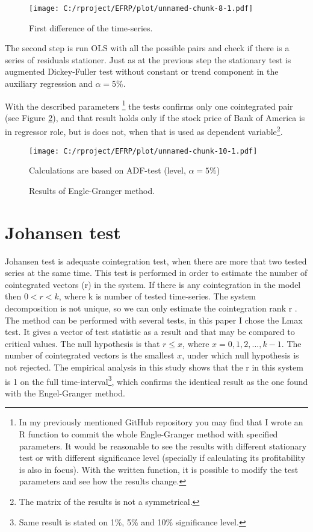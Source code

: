 \documentclass[12pt, a4paper, twoside, titlepage]{article}
\begin{document}
\begin{figure}[ht]
  \centering
  \texttt{[image: C:/rproject/EFRP/plot/unnamed-chunk-8-1.pdf]}
  \caption{First difference of the time-series.}
  \label{fig3}
\end{figure}

The second step is run OLS with all the possible pairs and check if there is a series of residuals stationer. Just as at the previous step the stationary test is augmented Dickey-Fuller test without constant or trend component in the auxiliary regression and $\alpha = 5\%$.

With the described parameters \footnote{In my previously mentioned GitHub repository you may find that I wrote an R function to commit the whole Engle-Granger method with specified parameters. It would be reasonable to see the results with different stationary test or with different significance level (specially if calculating its profitability is also in focus). With the written function, it is possible to modify the test parameters and see how the results change.} the tests confirms only one cointegrated pair (see Figure \ref{fig4}), and that result holds only if the stock price of Bank of America is in regressor role, but is does not, when that is used as dependent variable\footnote{The matrix of the results is not a symmetrical.}.

\begin{figure}[ht]
  \centering
  \texttt{[image: C:/rproject/EFRP/plot/unnamed-chunk-10-1.pdf]}
  \caption{Results of Engle-Granger method.}
  \label{fig4}
  Calculations are based on ADF-test (level, $\alpha = 5\%$)
\end{figure}

\section{Johansen test}

Johansen test is adequate cointegration test, when there are more that two tested series at the same time. This test is performed in order to estimate the number of cointegrated vectors (r) in the system. If there is any cointegration in the model then $0<r<k$, where k is number of tested time-series. The system decomposition is not unique, so we can only estimate the cointegration rank r \cite{Kirchgassner.2007}.
The method can be performed with several tests, in this paper I chose the Lmax test. It gives a vector of test statistic as a result and that may be compared to critical values. The null hypothesis is that $r \leq x$, where $x = 0, 1, 2, ..., k-1$. The number of cointegrated vectors is the smallest $x$, under which null hypothesis is not rejected. The empirical analysis in this study shows that the r in this system is 1 on the full time-interval\footnote{Same result is stated on 1\%, 5\% and 10\% significance level.}, which confirms the identical result as the one found with the Engel-Granger method.
\end{document}
